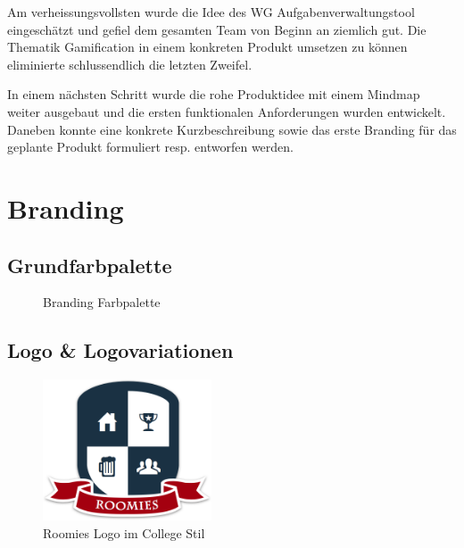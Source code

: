 Am verheissungsvollsten wurde die Idee des \gls{WG} Aufgabenverwaltungstool eingeschätzt und gefiel dem gesamten Team von Beginn an ziemlich gut. Die Thematik \gls{Gamification} in einem konkreten Produkt umsetzen zu können eliminierte schlussendlich die letzten Zweifel.

In einem nächsten Schritt wurde die rohe Produktidee mit einem Mindmap weiter ausgebaut und die ersten funktionalen Anforderungen wurden entwickelt. Daneben konnte eine konkrete Kurzbeschreibung sowie das erste Branding für das geplante Produkt formuliert resp. entworfen werden.

\section{Branding}
\label{sec:appendix-branding}

\subsection*{Grundfarbpalette}
\begin{figure}[H]

	\caption{Branding Farbpalette}
\end{figure}

\subsection*{Logo \protect\& Logovariationen}
\begin{figure}[H]
	\centering
	\includegraphics[width=5cm]{content/images/roomies-withshadow.png}
	\caption{Roomies Logo im College Stil}
\end{figure}

